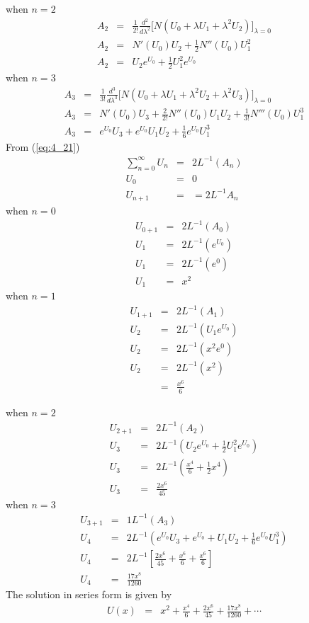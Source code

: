 \documentclass[11pt]{report}
\newcommand{\sps}{\\[0.2cm]}
\newcommand{\refn}[1]{(\ref{#1})}
\newcommand{\refx}[1]{\refn{eq:#1}}
\newcommand{\sprime}{'}
\newcommand{\dprime}{''}
\newcommand{\tprime}{'''}
\begin{document}
	when $n=2$
	\begin{eqnarray*}
		A_2 &=&\frac{1}{2!}\frac{d^2}{d\lambda^2}\Big[N (U_0 + \lambda U_1 + \lambda^2U_2)\Big]_{\lambda=0}\sps
		A_2 &=& N\sprime(U_0) U_2 + \frac{1}{2}N\dprime(U_0)U_1^2\sps
		A_2 &=& U_2e^{U_0} + \frac{1}{2}U_1^2e^{U_0}
	\end{eqnarray*}
	when $n=3$
	\begin{eqnarray*}
		A_3 &=&\frac{1}{3!}\frac{d^3}{d\lambda^3}\Big[N (U_0+ \lambda U_1 + \lambda^2U_2+\lambda^2U_3)\Big]_{\lambda=0}\sps
		A_3 &=& N\sprime(U_0)U_3 + \frac{2}{2!}N\dprime(U_0)U_1U_2 + \frac{1}{3!}N\tprime(U_0)U_1^3\sps
		A_3 &=& e^{U_0}U_3 + e^{U_0}U_1U_2 + \frac{1}{6}e^{U_0}U_1^3
	\end{eqnarray*}
	From \refx{4_21}
	\begin{eqnarray*}
		\sum_{n=0}^\infty U_n &=& 2L^{-1}(A_n)\sps
		U_0 &=& 0\sps
		U_{n+1} &=& = 2L^{-1}A_n
	\end{eqnarray*}
	when $n=0$
	\begin{eqnarray*}
		U_{0+1} &=&2L^{-1}(A_0)\sps
		U_1 &=&2L^{-1}(e^{U_0})\sps
		U_1 &=& 2L^{-1}(e^0)\sps
		U_1 &=& x^2
	\end{eqnarray*}
	when $n=1$
	\begin{eqnarray*}
		U_{1+1} &=& 2L^{-1}(A_1)\sps
		U_2 &=& 2L^{-1}(U_1e^{U_0})\sps
		U_2 &=& 2L^{-1}(x^2e^0)\sps
		U_2 &=& 2L^{-1}(x^2)\sps
		&=& \frac{x^6}{6}
	\end{eqnarray*}

	when $n=2$
	\begin{eqnarray*}
		U_{2+1} &=& 2L^{-1}(A_2)\sps
		U_3 &=& 2L^{-1}(U_2e^{U_0}+\frac{1}{2}U_1^2e^{U_0})\sps
		U_3 &=& 2L^{-1}\left(\frac{x^4}{6} + \frac{1}{2}x^4\right)\sps
		U_3 &=& \frac{2x^6}{45}
	\end{eqnarray*}
	when $n=3$
	\begin{eqnarray*}
		U_{3+1} &=& 1L^{-1}(A_3)\sps
		U_4 &=& 2L^{-1}(e^{U_0}U_3 + e^{U_0} + U_1U_2 + \frac{1}{6}e^{U_0}U_1^3)\sps
		U_4 &=&2L^{-1}\left[ \frac{2x^6}{45} + \frac{x^6}{6} + \frac{x^6}{6}  \right]\sps
		U_4 &=& \frac{17x^8}{1260}
	\end{eqnarray*}
	The solution in series form is given by
	\begin{eqnarray*}
		U(x) &=& x^2 +  \frac{x^4}{6} + \frac{2x^6}{45} + \frac{17x^8}{1260} + \cdots
	\end{eqnarray*}
\end{document}

